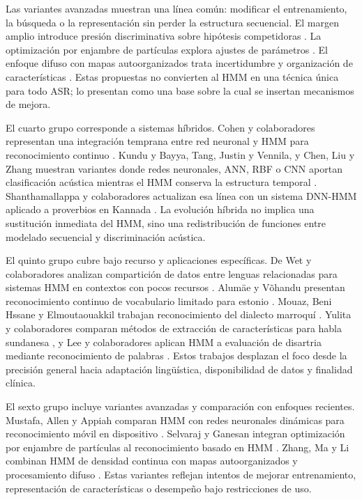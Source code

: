 Las variantes avanzadas muestran una línea común: modificar el entrenamiento, la búsqueda o la representación sin perder la estructura secuencial. El margen amplio introduce presión discriminativa sobre hipótesis competidoras \cite{Sha2007LargeMargin}. La optimización por enjambre de partículas explora ajustes de parámetros \cite{Selvaraj2014EnhancSpeech}. El enfoque difuso con mapas autoorganizados trata incertidumbre y organización de características \cite{Zhang2025FuzzySpeech}. Estas propuestas no convierten al HMM en una técnica única para todo ASR; lo presentan como una base sobre la cual se insertan mecanismos de mejora.

El cuarto grupo corresponde a sistemas híbridos. Cohen y colaboradores representan una integración temprana entre red neuronal y HMM para reconocimiento continuo \cite{Cohen1992HybridNeural}. Kundu y Bayya, Tang, Justin y Vennila, y Chen, Liu y Zhang muestran variantes donde redes neuronales, ANN, RBF o CNN aportan clasificación acústica mientras el HMM conserva la estructura temporal \cite{Kundu1998SpeechRecogn,Tang2009HybridHidden,Justin2013HybridSpeech,Chen2020ResearImprov}. Shanthamallappa y colaboradores actualizan esa línea con un sistema DNN-HMM aplicado a proverbios en Kannada \cite{Shanthamallappa2026DeepNeural}. La evolución híbrida no implica una sustitución inmediata del HMM, sino una redistribución de funciones entre modelado secuencial y discriminación acústica.

El quinto grupo cubre bajo recurso y aplicaciones específicas. De Wet y colaboradores analizan compartición de datos entre lenguas relacionadas para sistemas HMM en contextos con pocos recursos \cite{DeWet2017SpeechRecogn}. Alumäe y Võhandu presentan reconocimiento continuo de vocabulario limitado para estonio \cite{Alume2004LimiteVocabu}. Mouaz, Beni Hssane y Elmoutaouakkil trabajan reconocimiento del dialecto marroquí \cite{Mouaz2019SpeechRecogn}. Yulita y colaboradores comparan métodos de extracción de características para habla sundanesa \cite{Yulita2018FeaturExtrac}, y Lee y colaboradores aplican HMM a evaluación de disartria mediante reconocimiento de palabras \cite{Lee2019AssessDysart}. Estos trabajos desplazan el foco desde la precisión general hacia adaptación lingüística, disponibilidad de datos y finalidad clínica.

El sexto grupo incluye variantes avanzadas y comparación con enfoques recientes. Mustafa, Allen y Appiah comparan HMM con redes neuronales dinámicas para reconocimiento móvil en dispositivo \cite{Mustafa2019ComparReview}. Selvaraj y Ganesan integran optimización por enjambre de partículas al reconocimiento basado en HMM \cite{Selvaraj2014EnhancSpeech}. Zhang, Ma y Li combinan HMM de densidad continua con mapas autoorganizados y procesamiento difuso \cite{Zhang2025FuzzySpeech}. Estas variantes reflejan intentos de mejorar entrenamiento, representación de características o desempeño bajo restricciones de uso.

